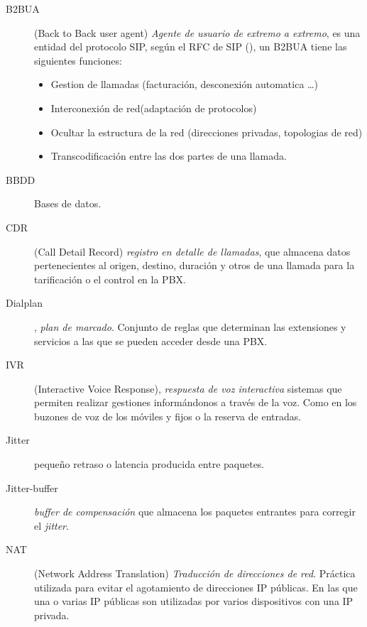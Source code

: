 \begin{description}

\item[B2BUA] \label{def:B2BUA} (Back to Back user agent) \emph{Agente de usuario de extremo a extremo}, es una entidad del protocolo SIP, según el RFC de SIP (\cite{rfc3261}), un B2BUA tiene las siguientes funciones:

  \begin{itemize}
  \item Gestion de llamadas (facturación, desconexión automatica \ldots)
  \item Interconexión de red(adaptación de protocolos)
  \item Ocultar la estructura de la red (direcciones privadas, topologias de red)
  \item Transcodificación entre las dos partes de una llamada.
  \end{itemize}


\item[BBDD] Bases de datos.

\item[CDR]  \label{def:CDR} (Call Detail Record) \emph{registro en detalle de llamadas}, que almacena datos pertenecientes al origen, destino, duración y otros de una llamada para la tarificación o el control en la PBX.

\item[Dialplan] \label{def:dialplan} , \emph{plan de marcado}. Conjunto de reglas que determinan las extensiones y servicios a las que se pueden acceder desde una PBX.

\item[IVR] (Interactive Voice Response), \emph{respuesta de voz interactiva} sistemas que permiten
realizar gestiones informándonos a través de la voz. Como en los buzones de voz de los móviles y fijos o la reserva de entradas.


\item[Jitter] pequeño retraso o latencia producida entre paquetes.

\item[Jitter-buffer] \label{def:jitter-buffer} \emph{buffer de compensación} que almacena los paquetes entrantes para corregir el \emph{jitter}.




\item[NAT] \label{def:NAT} (Network Address Translation) \emph{Traducción de direcciones de red}. Práctica utilizada para evitar el agotamiento de direcciones IP públicas. En las que una o varias IP públicas son utilizadas por varios dispositivos con una IP privada. 



\end{description}
